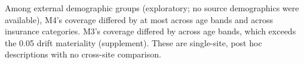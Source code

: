 Among external demographic groups (exploratory; no source demographics were
available), M4's coverage differed by at most \AgeCovDispMFour{} across age bands
and \InsCovDispMFour{} across insurance categories. M3's coverage differed by \AgeCovDispMThree{}
across age bands, which exceeds the 0.05 drift materiality (supplement). These
are single-site, post hoc descriptions with no cross-site comparison.

